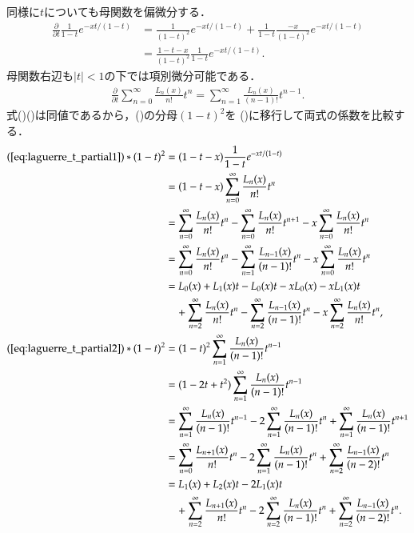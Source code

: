 \documentclass[a4j,papersize,disablejfam,slide,14pt]{jsarticle}
\def\exp#1{e^{#1}} %
\begin{document}
    同様に$t$についても母関数を偏微分する．
    \begin{align}
    	\frac{\partial}{\partial t} \frac{1}{1-t} \exp{-xt/(1-t)} &= \frac{1}{(1-t)^2} \exp{-xt/(1-t)} + \frac{1}{1-t}\frac{-x}{(1-t)^2} \exp{-xt/(1-t)} \\
        &= \frac{1-t-x}{(1-t)^2} \frac{1}{1-t} \exp{-xt/(1-t)}. \label{eq:laguerre_t_partial1}
    \end{align}
    母関数右辺も$|t|<1$の下では項別微分可能である．
    \begin{align}
    	\frac{\partial}{\partial t} \sum_{n=0}^{\infty} \frac{L_n(x)}{n!} t^n = \sum_{n=1}^{\infty} \frac{L_n(x)}{(n-1)!} t^{n-1}. \label{eq:laguerre_t_partial2}
    \end{align}
    式()()は同値であるから，()の分母$(1-t)^2$を
    ()に移行して両式の係数を比較する．
    \begin{align}
    	(\refeq{eq:laguerre_t_partial1}) * (1-t)^2 &= (1-t-x) \frac{1}{1-t} \exp{-xt/(1-t)} \\
        	&= (1-t-x) \sum_{n=0}^{\infty} \frac{L_n(x)}{n!} t^n \\
            &= \sum_{n=0}^{\infty} \frac{L_n(x)}{n!} t^n - \sum_{n=0}^{\infty} \frac{L_n(x)}{n!} t^{n+1} - x \sum_{n=0}^{\infty} \frac{L_n(x)}{n!} t^n \\
            &= \sum_{n=0}^{\infty} \frac{L_n(x)}{n!} t^n - \sum_{n=1}^{\infty} \frac{L_{n-1}(x)}{(n-1)!} t^n - x \sum_{n=0}^{\infty} \frac{L_n(x)}{n!} t^n \\
            &= L_0(x) + L_1(x) t - L_0(x) t - x L_0(x) - x L_1(x)t \\
            	&\quad+ \sum_{n=2}^{\infty} \frac{L_n(x)}{n!} t^n - \sum_{n=2}^{\infty} \frac{L_{n-1}(x)}{(n-1)!} t^n - x \sum_{n=2}^{\infty} \frac{L_n(x)}{n!} t^n, \\
        (\refeq{eq:laguerre_t_partial2}) * (1-t)^2 &= (1-t)^2 \sum_{n=1}^{\infty} \frac{L_n(x)}{(n-1)!} t^{n-1} \\
        	&= (1-2t+t^2) \sum_{n=1}^{\infty} \frac{L_n(x)}{(n-1)!} t^{n-1} \\
            &= \sum_{n=1}^{\infty} \frac{L_n(x)}{(n-1)!} t^{n-1} - 2 \sum_{n=1}^{\infty} \frac{L_n(x)}{(n-1)!} t^n + \sum_{n=1}^{\infty} \frac{L_n(x)}{(n-1)!} t^{n+1} \\
            &= \sum_{n=0}^{\infty} \frac{L_{n+1}(x)}{n!} t^n - 2 \sum_{n=1}^{\infty} \frac{L_n(x)}{(n-1)!} t^n + \sum_{n=2}^{\infty} \frac{L_{n-1}(x)}{(n-2)!} t^n \\
            &= L_1(x) + L_2(x)t - 2L_1(x)t \\
            	&\quad+ \sum_{n=2}^{\infty} \frac{L_{n+1}(x)}{n!} t^n - 2 \sum_{n=2}^{\infty} \frac{L_n(x)}{(n-1)!} t^n + \sum_{n=2}^{\infty} \frac{L_{n-1}(x)}{(n-2)!} t^n.
    \end{align}
\end{document}
